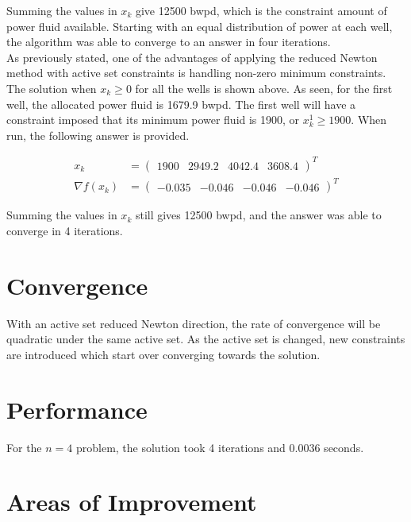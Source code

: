 \documentclass{article}
\begin{document}
Summing the values in $x_k$ give 12500 bwpd, which is the constraint amount of power fluid available. Starting with an equal distribution of power at each well, the algorithm was able to converge to an answer in four iterations. \\

As previously stated, one of the advantages of applying the reduced Newton method with active set constraints is handling non-zero minimum constraints. The solution when $x_k \geq 0$ for all the wells is shown above. As seen, for the first well, the allocated power fluid is 1679.9 bwpd. The first well will have a constraint imposed that its minimum power fluid is 1900, or $x_k^1 \geq 1900$. When run, the following answer is provided.

\begin{equation*}
\begin{aligned}
    x_{k} & = 
    \begin{pmatrix}
        1900 & 2949.2 & 4042.4 & 3608.4
    \end{pmatrix}^{T} \\
    \nabla f(x_{k}) & =
    \begin{pmatrix}
        -0.035 & -0.046 & -0.046 & -0.046
    \end{pmatrix}^T
\end{aligned}
\end{equation*}

Summing the values in $x_k$ still gives 12500 bwpd, and the answer was able to converge in 4 iterations.

\section{Convergence}

With an active set reduced Newton direction, the rate of convergence will be quadratic under the same active set. As the active set is changed, new constraints are introduced which start over converging towards the solution.

\section{Performance}

For the $n=4$ problem, the solution took 4 iterations and 0.0036 seconds.

\section{Areas of Improvement}
\end{document}

